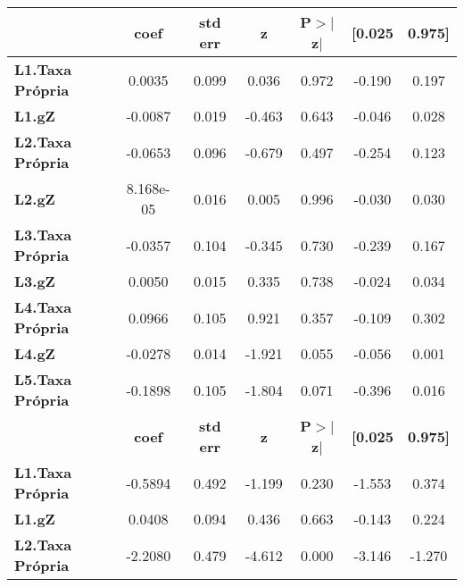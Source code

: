 \begin{center}
\begin{tabular}{lcccccc}
\toprule
                         & \textbf{coef} & \textbf{std err} & \textbf{z} & \textbf{P$> |$z$|$} & \textbf{[0.025} & \textbf{0.975]}  \\
\midrule
\textbf{L1.Taxa Própria} &       0.0035  &        0.099     &     0.036  &         0.972        &       -0.190    &        0.197     \\
\textbf{L1.gZ}           &      -0.0087  &        0.019     &    -0.463  &         0.643        &       -0.046    &        0.028     \\
\textbf{L2.Taxa Própria} &      -0.0653  &        0.096     &    -0.679  &         0.497        &       -0.254    &        0.123     \\
\textbf{L2.gZ}           &    8.168e-05  &        0.016     &     0.005  &         0.996        &       -0.030    &        0.030     \\
\textbf{L3.Taxa Própria} &      -0.0357  &        0.104     &    -0.345  &         0.730        &       -0.239    &        0.167     \\
\textbf{L3.gZ}           &       0.0050  &        0.015     &     0.335  &         0.738        &       -0.024    &        0.034     \\
\textbf{L4.Taxa Própria} &       0.0966  &        0.105     &     0.921  &         0.357        &       -0.109    &        0.302     \\
\textbf{L4.gZ}           &      -0.0278  &        0.014     &    -1.921  &         0.055        &       -0.056    &        0.001     \\
\textbf{L5.Taxa Própria} &      -0.1898  &        0.105     &    -1.804  &         0.071        &       -0.396    &        0.016     \\
                         & \textbf{coef} & \textbf{std err} & \textbf{z} & \textbf{P$> |$z$|$} & \textbf{[0.025} & \textbf{0.975]}  \\
\midrule
\textbf{L1.Taxa Própria} &      -0.5894  &        0.492     &    -1.199  &         0.230        &       -1.553    &        0.374     \\
\textbf{L1.gZ}           &       0.0408  &        0.094     &     0.436  &         0.663        &       -0.143    &        0.224     \\
\textbf{L2.Taxa Própria} &      -2.2080  &        0.479     &    -4.612  &         0.000        &       -3.146    &       -1.270     \\

\end{tabular}
\end{center}
